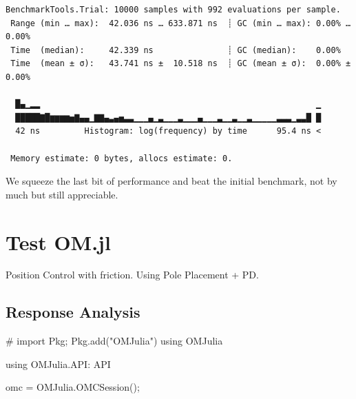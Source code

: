 \documentclass[
  8pt,
  a4paper,
]{book}
\newenvironment{Shaded}{\begin{snugshade}}{\end{snugshade}}
\newcommand{\BuiltInTok}[1]{\textcolor[rgb]{0.00,0.23,0.31}{#1}}
\newcommand{\CommentTok}[1]{\textcolor[rgb]{0.37,0.37,0.37}{#1}}
\newcommand{\FunctionTok}[1]{\textcolor[rgb]{0.28,0.35,0.67}{#1}}
\newcommand{\ImportTok}[1]{\textcolor[rgb]{0.00,0.46,0.62}{#1}}
\newcommand{\NormalTok}[1]{\textcolor[rgb]{0.00,0.23,0.31}{#1}}
\newcommand{\OperatorTok}[1]{\textcolor[rgb]{0.37,0.37,0.37}{#1}}
\begin{document}
\begin{verbatim}
BenchmarkTools.Trial: 10000 samples with 992 evaluations per sample.
 Range (min … max):  42.036 ns … 633.871 ns  ┊ GC (min … max): 0.00% … 0.00%
 Time  (median):     42.339 ns               ┊ GC (median):    0.00%
 Time  (mean ± σ):   43.741 ns ±  10.518 ns  ┊ GC (mean ± σ):  0.00% ± 0.00%

  █▄▁▂▂                                                        ▁
  █████▇█▆▆▆▆▅▇▄▄▁▇▇▄▃▄▅▃▃▁▁▁▄▁▃▁▁▁▃▁▁▁▄▁▁▁▃▁▁▃▁▁▃▁▁▁▁▁▃▃▃▁▃▃█ █
  42 ns         Histogram: log(frequency) by time      95.4 ns <

 Memory estimate: 0 bytes, allocs estimate: 0.
\end{verbatim}

We squeeze the last bit of performance and beat the initial benchmark,
not by much but still appreciable.

\chapter{Test OM.jl}\label{test-om.jl}

Position Control with friction. Using Pole Placement + PD.

\hfill\break

\section{Response Analysis}\label{response-analysis-2}

\begin{Shaded}
\begin{Highlighting}[]
\CommentTok{\# import Pkg; Pkg.add("OMJulia")}
\ImportTok{using} \BuiltInTok{OMJulia}
\end{Highlighting}
\end{Shaded}

\begin{Shaded}
\begin{Highlighting}[]
\ImportTok{using} \BuiltInTok{OMJulia.API}\NormalTok{: API}
\end{Highlighting}
\end{Shaded}

\begin{Shaded}
\begin{Highlighting}[]
\NormalTok{omc }\OperatorTok{=}\NormalTok{ OMJulia.}\FunctionTok{OMCSession}\NormalTok{();}
\end{Highlighting}
\end{Shaded}
\end{document}
